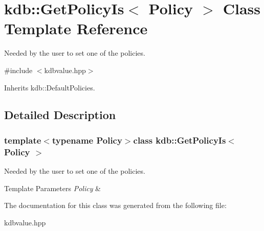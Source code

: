 \hypertarget{classkdb_1_1GetPolicyIs}{\section{kdb\+:\+:Get\+Policy\+Is$<$ Policy $>$ Class Template Reference}
\label{classkdb_1_1GetPolicyIs}
}


Needed by the user to set one of the policies.  




{\ttfamily \#include $<$kdbvalue.\+hpp$>$}



Inherits kdb\+::\+Default\+Policies.



\subsection{Detailed Description}
\subsubsection*{template$<$typename Policy$>$class kdb\+::\+Get\+Policy\+Is$<$ Policy $>$}

Needed by the user to set one of the policies. 


\begin{DoxyTemplParams}{Template Parameters}
{\em Policy} & \\
\hline
\end{DoxyTemplParams}


The documentation for this class was generated from the following file\+:\begin{DoxyCompactItemize}
\item 
kdbvalue.\+hpp\end{DoxyCompactItemize}
